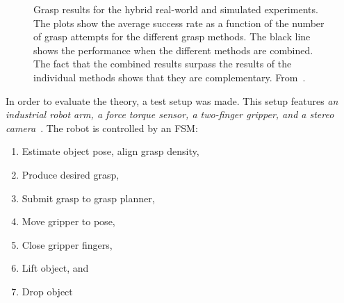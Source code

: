  \begin{figure}
 	\centering
 	\caption{Grasp results for the hybrid real-world and simulated experiments. The plots show the average success rate as a function of the number of grasp attempts for the different grasp methods. The black line shows the performance when the different methods are combined. The fact that the combined results surpass the results of the individual methods shows that they are complementary. From~\cite{kootstra}.}
 	\label{fig:kootstra21}
 \end{figure}
 
 In order to evaluate the theory, a test setup was made. This setup features \emph{an industrial robot arm, a force torque sensor, a two-finger gripper, and a stereo camera}~\cite{detry}. 
 The robot is controlled by an FSM:
 \begin{enumerate}
 	\item Estimate object pose, align grasp density,
 	\item Produce desired grasp,
 	\item Submit grasp to grasp planner,
 	\item Move gripper to pose,
 	\item Close gripper fingers,
 	\item Lift object, and
 	\item Drop object
 \end{enumerate}